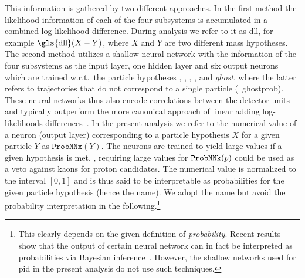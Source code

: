 This information is gathered by two different approaches.
In the first method the likelihood information of each of the four subsystems is accumulated in a combined log-likelihood difference.
During analysis we refer to it as \gls{dll}, for example $\operatorname{\gls{dll}}(X-Y)$, where $X$ and $Y$ are two different mass hypotheses.
The second method utilizes a shallow neural network with the information of the four subsystems as the input layer, one hidden layer and six output neurons which are trained w.r.t.\ the particle hypotheses \electron, \muon, \kaon, \pion, \proton and \textit{ghost}, where the latter refers to trajectories that do not correspond to a single particle (\cf{}~\gls{ghostprob}).
These neural networks thus also encode correlations between the detector units and typically outperform the more canonical approach of linear adding log-likelihoods differences~\cite{lhcbPerformance_run1,lhcbDetector,lhcbmlpid}.
In the present analysis we refer to the numerical value of a neuron (output layer) corresponding to a particle hypothesis $X$ for a given particle $Y$ as $\texttt{ProbNNx}(Y)$.
The neurons are trained to yield large values if a given hypothesis is met, \eg{}, requiring large values for $\texttt{ProbNNk}({p})$ could be used as a veto against kaons for proton candidates.
The numerical value is normalized to the interval $[0,1]$ and is thus said to be interpretable as probabilities for the given particle hypothesis (hence the name).
We adopt the name but avoid the probability interpretation in the following.\footnote{This clearly depends on the given definition of \textit{probability}. Recent results show that the output of certain neural network can in fact be interpreted as probabilities via Bayesian inference~\cite{bayesnn1,bayesnn2}. However, the shallow networks used for \gls{pid} in the present analysis do not use such techniques.}

